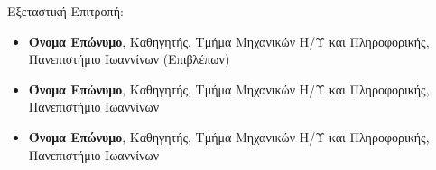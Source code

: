 Εξεταστική Επιτροπή:
\begin{itemize}
\item \textbf{Όνομα Επώνυμο}, Καθηγητής, Τμήμα Μηχανικών Η/Υ και
Πληροφορικής, Πανεπιστήμιο Ιωαννίνων (Επιβλέπων)
\item \textbf{Όνομα Επώνυμο}, Καθηγητής, Τμήμα Μηχανικών Η/Υ και
Πληροφορικής, Πανεπιστήμιο Ιωαννίνων
\item \textbf{Όνομα Επώνυμο}, Καθηγητής, Τμήμα Μηχανικών Η/Υ και
Πληροφορικής, Πανεπιστήμιο Ιωαννίνων

\end{itemize} 